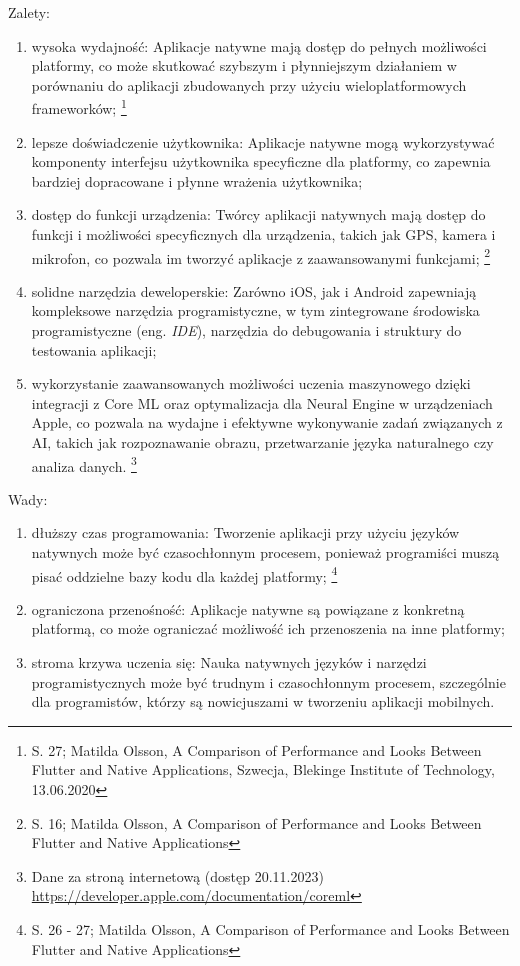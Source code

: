 \documentclass[12pt, a4paper, twoside, openany]{book}
\begin{document}
Zalety:
\begin{enumerate}[label=--]
    \item wysoka wydajność: Aplikacje natywne mają dostęp do pełnych możliwości platformy, co może skutkować szybszym i płynniejszym działaniem w porównaniu do aplikacji zbudowanych przy użyciu wieloplatformowych frameworków; \footnote{S. 27; Matilda Olsson, A Comparison of Performance and Looks Between Flutter and Native Applications, Szwecja, Blekinge Institute of Technology, 13.06.2020}
    \item lepsze doświadczenie użytkownika: Aplikacje natywne mogą wykorzystywać komponenty interfejsu użytkownika specyficzne dla platformy, co zapewnia bardziej dopracowane i płynne wrażenia użytkownika;
    \item dostęp do funkcji urządzenia: Twórcy aplikacji natywnych mają dostęp do funkcji i możliwości specyficznych dla urządzenia, takich jak GPS, kamera i mikrofon, co pozwala im tworzyć aplikacje z zaawansowanymi funkcjami; \footnote{S. 16; Matilda Olsson, A Comparison of Performance and Looks Between Flutter and Native Applications}
    \item solidne narzędzia deweloperskie: Zarówno iOS, jak i Android zapewniają kompleksowe narzędzia programistyczne, w tym zintegrowane środowiska programistyczne (eng. \textit{IDE}), narzędzia do debugowania i struktury do testowania aplikacji;
    \item wykorzystanie zaawansowanych możliwości uczenia maszynowego dzięki integracji z Core ML oraz optymalizacja dla Neural Engine w urządzeniach Apple, co pozwala na wydajne i efektywne wykonywanie zadań związanych z AI, takich jak rozpoznawanie obrazu, przetwarzanie języka naturalnego czy analiza danych. \footnote{ Dane za stroną internetową (dostęp 20.11.2023) \url{https://developer.apple.com/documentation/coreml} }
\end{enumerate}

Wady:
\begin{enumerate}[label=--]
    \item dłuższy czas programowania: Tworzenie aplikacji przy użyciu języków natywnych może być czasochłonnym procesem, ponieważ programiści muszą pisać oddzielne bazy kodu dla każdej platformy; \footnote{S. 26 - 27; Matilda Olsson, A Comparison of Performance and Looks Between Flutter and Native Applications}
    \item ograniczona przenośność: Aplikacje natywne są powiązane z konkretną platformą, co może ograniczać możliwość ich przenoszenia na inne platformy;
    \item stroma krzywa uczenia się: Nauka natywnych języków i narzędzi programistycznych może być trudnym i czasochłonnym procesem, szczególnie dla programistów, którzy są nowicjuszami w tworzeniu aplikacji mobilnych.
\end{enumerate}
\end{document}
